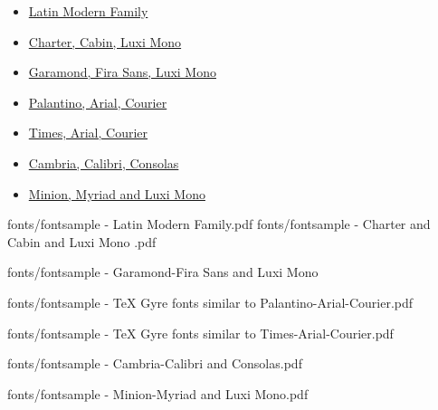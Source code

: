 \begin{itemize}
\item \hyperref[sec:doc:fonts:Latin Modern Family]{Latin Modern Family}
\item \hyperref[sec:doc:fonts:Charter-Bera Sans-Luxi Mono]{Charter, Cabin, Luxi Mono}
\item \hyperref[sec:doc:fonts:Garamond-Bera Sans-Luxi Mono]{Garamond, Fira Sans, Luxi Mono}
\item \hyperref[sec:doc:fonts:Palantino-Arial-Courier]{Palantino, Arial, Courier}
\item \hyperref[sec:doc:fonts:Times-Arial-Courier]{Times, Arial, Courier}
\item \hyperref[sec:doc:fonts:Cambria-Calibri-Consolas]{Cambria, Calibri, Consolas}
\item \hyperref[sec:doc:fonts:Minion-Myriad-Luxi Mono]{Minion, Myriad and Luxi Mono}
\end{itemize}

\clearpage

\label{sec:doc:fonts:Latin Modern Family}
%
	{fonts/fontsample - Latin Modern Family.pdf}
\label{sec:doc:fonts:Charter-Bera Sans-Luxi Mono}
%
	{fonts/fontsample - Charter and Cabin and Luxi Mono .pdf}
\label{sec:doc:fonts:Garamond-Bera Sans-Luxi Mono}

	{fonts/fontsample - Garamond-Fira Sans and Luxi Mono}
%
\label{sec:doc:fonts:Palantino-Arial-Courier}

	{fonts/fontsample - TeX Gyre fonts similar to Palantino-Arial-Courier.pdf}
\label{sec:doc:fonts:Times-Arial-Courier}	

	{fonts/fontsample - TeX Gyre fonts similar to Times-Arial-Courier.pdf}
\label{sec:doc:fonts:Cambria-Calibri-Consolas}	

{fonts/fontsample - Cambria-Calibri and Consolas.pdf}
\label{sec:doc:fonts:Minion-Myriad-Luxi Mono}	

{fonts/fontsample - Minion-Myriad and Luxi Mono.pdf}
